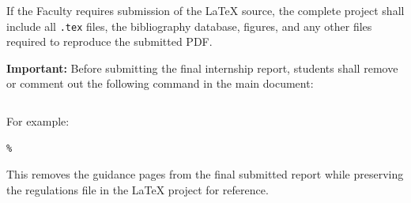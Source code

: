 {If the Faculty requires submission of the \LaTeX{} source, the complete
project shall include all \verb|.tex| files, the bibliography database,
figures, and any other files required to reproduce the submitted PDF.

\vspace{0.4cm}

\noindent
\textbf{Important:}
Before submitting the final internship report, students shall remove or
comment out the following command in the main document:

\begin{verbatim}

\end{verbatim}

For example:

\begin{verbatim}
% 
\end{verbatim}

This removes the guidance pages from the final submitted report while
preserving the regulations file in the \LaTeX{} project for reference.

} %

\clearpage
